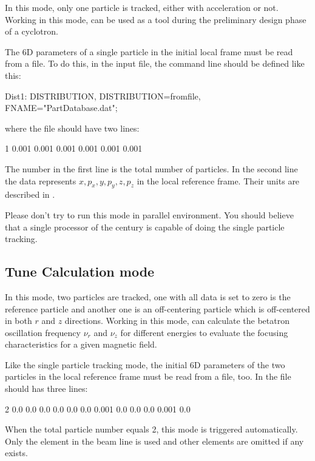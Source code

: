   In this mode, only one particle is tracked, either with acceleration or not.  Working in this mode, \opalcycl
  can be used as a tool during the preliminary design phase of a cyclotron.

  The 6D parameters of a single particle in the initial local frame must be read from a file. To do this, in the \opal input file,
  the command line   should be defined like this:
\begin{example}
  Dist1: DISTRIBUTION, DISTRIBUTION=fromfile, FNAME="PartDatabase.dat";
\end{example}
 where the file  should have two lines:
\begin{example}
 1
 0.001 0.001   0.001   0.001   0.001  0.001
\end{example}
The number in the first line is the total number of particles.
In the second line the data represents $x, p_x, y,$$ p_y, z, p_z$ in the local reference frame. Their units are described in .

Please don't try to run this mode in parallel environment. You should believe that a single processor of the  century is capable of doing
the single particle tracking.

\subsection{Tune Calculation mode}

  In this mode, two particles are tracked, one with all data is set to zero is the reference particle and another one is an off-centering particle
  which is off-centered in both $r$ and $z$ directions. Working in this mode, \opalcycl can calculate the betatron oscillation frequency $\nu_r$ and $\nu_z$ for different energies to evaluate the focusing characteristics
  for a given magnetic field.

  Like the single particle tracking mode,
  the initial 6D parameters of the two particles in the local reference frame must be read from a file, too.
  In the file should has three lines:
\begin{example}
 2
 0.0   0.0   0.0   0.0   0.0   0.0
 0.001 0.0   0.0   0.0   0.001  0.0
\end{example}

When the total particle number equals 2, this mode is triggered automatically.
Only the element  in the beam line is used and other elements are omitted if any exists.

